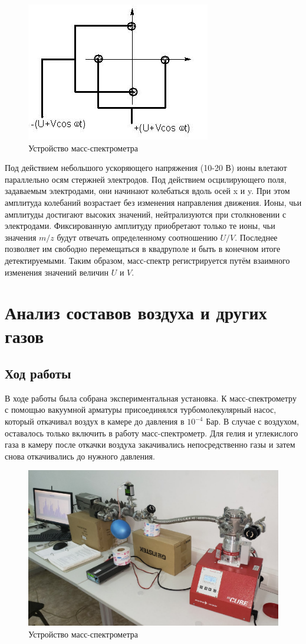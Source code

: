 \documentclass[a4paper,14pt]{extarticle}
\begin{document}
			\begin{figure}[h!]
				\centering
				\includegraphics[width=.55\linewidth]{Lab2_2.jpg}
				\caption{Устройство масс-спектрометра}
				\label{fig2}
			\end{figure}
		
			Под действием небольшого ускоряющего напряжения (10-20 В) ионы влетают параллельно осям стержней электродов. Под действием осцилирующего поля, задаваемым электродами, они начинают колебаться вдоль осей x и y. При этом амплитуда колебаний возрастает без изменения направления движения. Ионы, чьи амплитуды достигают высоких значений, нейтрализуются при столкновении с электродами. Фиксированную амплитуду приобретают только те ионы, чьи значения $m / z$ будут отвечать определенному соотношению $U / V$. Последнее позволяет им свободно перемещаться в квадруполе и быть в конечном итоге детектируемыми. Таким образом, масс-спектр регистрируется путём взаимного изменения значений величин $U$ и $V$.
			
	\section{Анализ составов воздуха и других газов}
		\subsection{Ход работы}
			В ходе работы была собрана экспериментальная установка. К масс-спектрометру с помощью вакуумной арматуры присоединялся турбомолекулярный насос, который откачивал воздух в камере до давления в $10^{-4}$ Бар. В случае с воздухом, оставалось только включить в работу масс-спектрометр. Для гелия и углекислого газа в камеру после откачки воздуха закачивались непосредственно газы и затем снова откачивались до нужного давления.
			\begin{figure}[h!]
				\centering
				\includegraphics[width=.55\linewidth]{Lab2_3.png}
				\caption{Устройство масс-спектрометра}
				\label{fig3}
			\end{figure}
			\newpage
			
\end{document}
